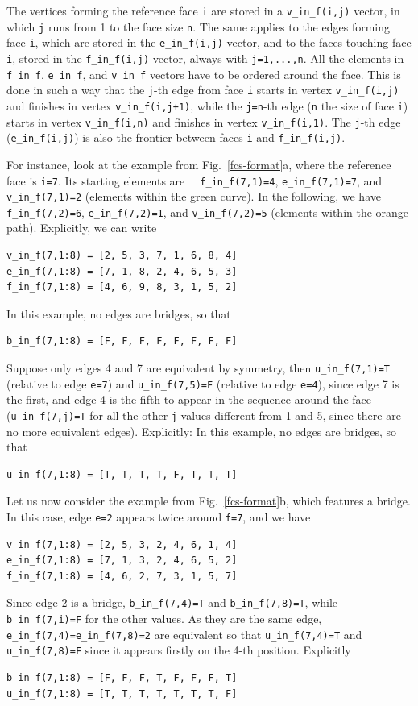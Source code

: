 \documentclass{scrreprt}
\begin{document}
The vertices forming the reference face \verb-i- are stored in a \verb-v_in_f(i,j)- vector, in which \verb-j- runs from 1 to the face size \verb-n-. The same applies to the edges forming face \verb-i-, which are stored in the \verb-e_in_f(i,j)- vector, and to the faces touching face \verb-i-, stored in the \verb-f_in_f(i,j)- vector, always with \verb-j=1,...,n-. All the elements in \verb-f_in_f-, \verb-e_in_f-, and \verb-v_in_f- vectors have to be ordered around the face. This is done in such a way that the \verb-j--th edge from face \verb-i- starts in vertex \verb-v_in_f(i,j)- and finishes in vertex \verb-v_in_f(i,j+1)-, while the \verb-j=n--th edge (\verb-n- the size of face \verb-i-) starts in vertex \verb-v_in_f(i,n)- and finishes in vertex \verb-v_in_f(i,1)-. The \verb-j--th edge (\verb-e_in_f(i,j)-) is also the frontier between faces \verb-i- and \verb-f_in_f(i,j)-.
 
For instance, look at the example from Fig.~\ref{fcs-format}a, where the reference face is \verb-i=7-. Its starting elements are \verb-  f_in_f(7,1)=4-, \verb-e_in_f(7,1)=7-, and \verb-v_in_f(7,1)=2- (elements within the green curve). In the following, we have \verb-f_in_f(7,2)=6-, \verb-e_in_f(7,2)=1-, and \verb-v_in_f(7,2)=5- (elements within the orange path). Explicitly, we can write
\begin{verbatim}
v_in_f(7,1:8) = [2, 5, 3, 7, 1, 6, 8, 4]
e_in_f(7,1:8) = [7, 1, 8, 2, 4, 6, 5, 3]
f_in_f(7,1:8) = [4, 6, 9, 8, 3, 1, 5, 2]
\end{verbatim}
In this example, no edges are bridges, so that
\begin{verbatim}
b_in_f(7,1:8) = [F, F, F, F, F, F, F, F]
\end{verbatim}
Suppose only edges 4 and 7 are equivalent by symmetry, then \verb-u_in_f(7,1)=T- (relative to edge \verb-e=7-) and \verb-u_in_f(7,5)=F- (relative to edge \verb-e=4-), since edge 7 is the first, and edge 4 is the fifth to appear in the sequence around the face (\verb-u_in_f(7,j)=T- for all the other \verb-j- values different from 1 and 5, since there are no more equivalent edges). Explicitly:
In this example, no edges are bridges, so that
\begin{verbatim}
u_in_f(7,1:8) = [T, T, T, T, F, T, T, T]
\end{verbatim}

Let us now consider the example from Fig.~\ref{fcs-format}b, which features a bridge. In this case, edge \verb-e=2- appears twice around \verb-f=7-, and we have 
\begin{verbatim}
v_in_f(7,1:8) = [2, 5, 3, 2, 4, 6, 1, 4]
e_in_f(7,1:8) = [7, 1, 3, 2, 4, 6, 5, 2]
f_in_f(7,1:8) = [4, 6, 2, 7, 3, 1, 5, 7]
\end{verbatim}
Since edge 2 is a bridge, \verb-b_in_f(7,4)=T- and \verb-b_in_f(7,8)=T-, while \verb-b_in_f(7,i)=F- for the other values. As they are the same edge, \verb-e_in_f(7,4)=e_in_f(7,8)=2- are equivalent so that \verb-u_in_f(7,4)=T- and \verb-u_in_f(7,8)=F- since it appears firstly on the 4-th position. Explicitly
\begin{verbatim}
b_in_f(7,1:8) = [F, F, F, T, F, F, F, T]
u_in_f(7,1:8) = [T, T, T, T, T, T, T, F]
\end{verbatim}
\end{document}
